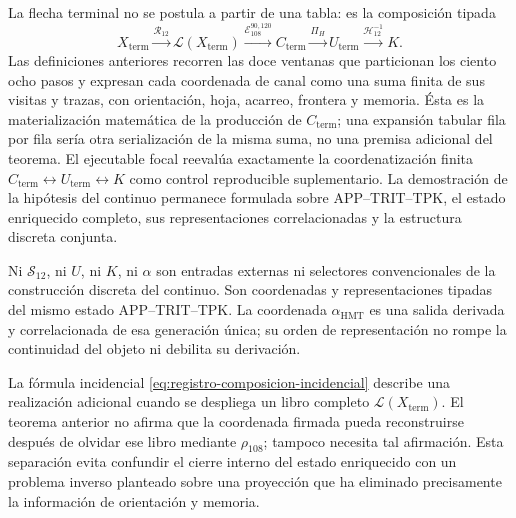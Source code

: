 \begin{remark}
La flecha terminal no se postula a partir de una tabla: es la composición
tipada
\[
 X_{\mathrm{term}}
 \xrightarrow{\mathcal R_{12}}\mathscr L(X_{\mathrm{term}})
 \xrightarrow{\mathcal E_{108}^{90,120}}C_{\mathrm{term}}
 \xrightarrow{\Pi_H}U_{\mathrm{term}}
 \xrightarrow{\mathcal H_{12}^{-1}}K .
\]
Las definiciones anteriores recorren las doce ventanas que particionan los
ciento ocho pasos y expresan cada coordenada de canal como una suma finita de
sus visitas y trazas, con orientación, hoja, acarreo, frontera y memoria. Ésta
es la materialización matemática de la producción de
\(C_{\mathrm{term}}\); una expansión tabular fila por fila sería otra
serialización de la misma suma, no una premisa adicional del teorema. El
ejecutable focal reevalúa exactamente la coordenatización finita
\(C_{\mathrm{term}}\leftrightarrow U_{\mathrm{term}}\leftrightarrow K\)
como control reproducible suplementario. La demostración de la hipótesis del
continuo permanece formulada sobre APP--TRIT--TPK, el estado enriquecido
completo, sus representaciones correlacionadas y la estructura discreta conjunta.
\end{remark}

Ni \(\mathcal S_{12}\), ni \(U\), ni \(K\), ni \(\alpha\) son entradas
externas ni selectores convencionales de la construcción discreta del
continuo. Son coordenadas y representaciones tipadas del mismo estado
APP--TRIT--TPK. La coordenada \(\alpha_{\mathrm{HMT}}\) es una salida derivada
y correlacionada de esa generación única; su orden de representación no rompe la
continuidad del objeto ni debilita su derivación.

La fórmula incidencial \eqref{eq:registro-composicion-incidencial} describe
una realización adicional cuando se despliega un libro completo
\(\mathscr L(X_{\mathrm{term}})\). El teorema anterior no afirma que la
coordenada firmada pueda reconstruirse después de olvidar ese libro mediante
\(\rho_{108}\); tampoco necesita tal afirmación. Esta separación evita
confundir el cierre interno del estado enriquecido con un problema inverso
planteado sobre una proyección que ha eliminado precisamente la información
de orientación y memoria.

